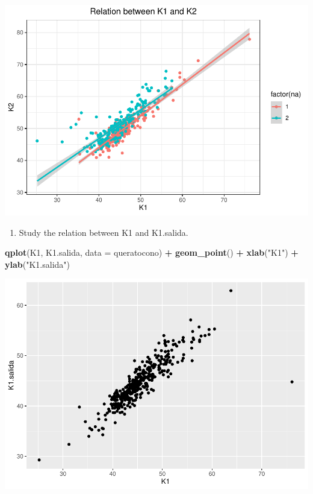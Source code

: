 \documentclass[
]{article}
\newenvironment{Shaded}{\begin{snugshade}}{\end{snugshade}}
\newcommand{\DataTypeTok}[1]{\textcolor[rgb]{0.13,0.29,0.53}{#1}}
\newcommand{\KeywordTok}[1]{\textcolor[rgb]{0.13,0.29,0.53}{\textbf{#1}}}
\newcommand{\NormalTok}[1]{#1}
\newcommand{\OperatorTok}[1]{\textcolor[rgb]{0.81,0.36,0.00}{\textbf{#1}}}
\newcommand{\StringTok}[1]{\textcolor[rgb]{0.31,0.60,0.02}{#1}}
\providecommand{\tightlist}{%
  \setlength{\itemsep}{0pt}\setlength{\parskip}{0pt}}
\begin{document}
\includegraphics{document_files/figure-latex/unnamed-chunk-4-1.pdf}

\begin{enumerate}
\def\labelenumi{\arabic{enumi}.}
\setcounter{enumi}{2}
\tightlist
\item
  Study the relation between K1 and K1.salida.
\end{enumerate}

\begin{Shaded}
\begin{Highlighting}[]
\KeywordTok{qplot}\NormalTok{(K1, K1.salida, }\DataTypeTok{data =}\NormalTok{ queratocono) }\OperatorTok{+}
\StringTok{  }\KeywordTok{geom_point}\NormalTok{() }\OperatorTok{+}\StringTok{ }
\StringTok{  }\KeywordTok{xlab}\NormalTok{(}\StringTok{"K1"}\NormalTok{) }\OperatorTok{+}\StringTok{ }\KeywordTok{ylab}\NormalTok{(}\StringTok{"K1.salida"}\NormalTok{)}
\end{Highlighting}
\end{Shaded}

\includegraphics{document_files/figure-latex/unnamed-chunk-5-1.pdf}
\end{document}
